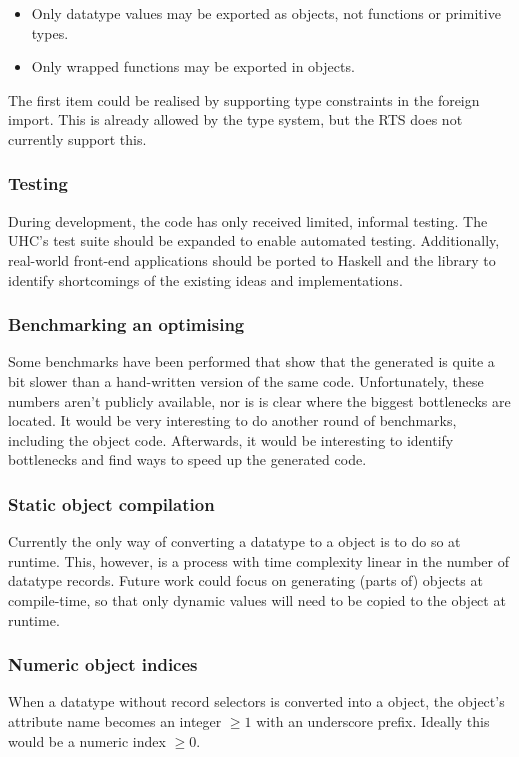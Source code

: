 \documentclass{llncs}
\renewcommand{\geq}{\geqslant}
\begin{document}
\begin{itemize}
  \item Only datatype values may be exported as objects, not functions or
        primitive types.
  \item Only wrapped functions may be exported in objects.
\end{itemize}

The first item could be realised by supporting type constraints in the foreign
import. This is already allowed by the type system, but the RTS does not
currently support this.

\subsubsection*{Testing}
During development, the code has only received limited, informal testing. The
UHC's test suite should be expanded to enable automated testing. Additionally,
real-world \js front-end applications should be ported to Haskell and the
\uhcjscript library to identify shortcomings of the existing ideas and
implementations.

\subsubsection*{Benchmarking an optimising}
Some benchmarks have been performed that show that the generated \js is quite
a bit slower than a hand-written version of the same code. Unfortunately, these
numbers aren't publicly available, nor is is clear where the biggest
bottlenecks are located. It would be very interesting to do another round of
benchmarks, including the object code. Afterwards, it would be interesting to
identify bottlenecks and find ways to speed up the generated code.

\subsubsection*{Static object compilation}
Currently the only way of converting a datatype to a \js object is to do so at
runtime. This, however, is a process with time complexity linear in the number
of datatype records. Future work could focus on generating (parts of) \js
objects at compile-time, so that only dynamic values will need to be copied to
the object at runtime.

\subsubsection*{Numeric object indices}
When a datatype without record selectors is converted into a \js object, the
object's attribute name becomes an integer $\geq{1}$ with an underscore prefix.
Ideally this would be a numeric index $\geq{0}$.
\end{document}

